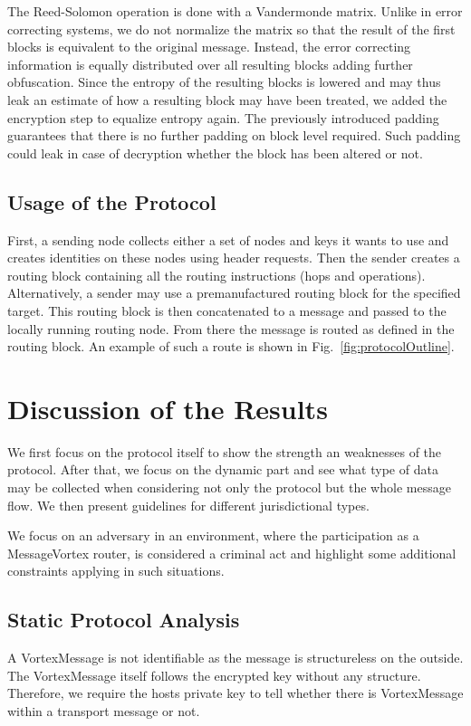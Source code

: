 \documentclass[10pt,journal,compsoc]{IEEEtran}
\begin{document}
The Reed-Solomon operation is done with a Vandermonde matrix. Unlike in error correcting systems, we do not normalize the matrix so that the result of the first blocks is equivalent to the original message. Instead, the error correcting information is equally distributed over all resulting blocks adding further obfuscation. Since the entropy of the resulting blocks is lowered and may thus leak an estimate of how a resulting block may have been treated, we added the encryption step to equalize entropy again. The previously introduced padding guarantees that there is no further padding on block level required. Such padding could leak in case of decryption whether the block has been altered or not.

\subsection{Usage of the Protocol}
First, a sending node collects either a set of nodes and keys it wants to use and creates identities on these nodes using header requests. Then the sender creates a routing block containing all the routing instructions (hops and operations). Alternatively, a sender may use a premanufactured routing block for the specified target. This routing block is then concatenated to a message and passed to the locally running routing node. From there the message is routed as defined in the routing block. An example of such a route is shown in Fig.~\ref{fig:protocolOutline}.

\section{Discussion of the Results}
We first focus on the protocol itself to show the strength an weaknesses of the protocol. After that, we focus on the dynamic part and see what type of data may be collected when considering not only the protocol but the whole message flow. We then present guidelines for different jurisdictional types.

We focus on an adversary in an environment, where the participation as a MessageVortex router, is considered a criminal act and highlight some additional constraints applying in such situations.

\subsection{Static Protocol Analysis\label{sec:staticAnalysis}}
A VortexMessage is not identifiable as the message is structureless on the outside. The VortexMessage itself follows the encrypted key without any structure. Therefore, we require the hosts private key to tell whether there is VortexMessage within a transport message or not.
\end{document}
